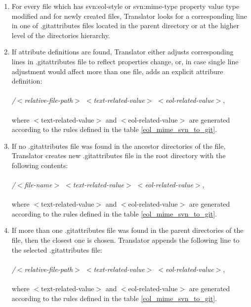 \begin{enumerate}
\compactlist
\item For every file which has svn:eol-style or svn:mime-type property value type modified \footnotemark[1] and for newly created files, Translator looks for a corresponding line in one of .gitattributes files located in the parent directory or at the higher level of the directories hierarchy.\\
	
\item If attribute definitions are found, Translator either adjusts corresponding lines in .gitattributes file to reflect properties change, 
or, in case single line adjustment would affect more than one file, adds an explicit attribure definition:\\\\
\emph{/$<$relative-file-path$>$ $<$text-related-value$>$ $<$eol-related-value$>$},\\\\
where $<$text-related-value$>$ and $<$eol-related-value$>$ are generated according to the rules defined in the table \ref{eol_mime_svn_to_git}.\\
	
\item If no .gitattributes file was found in the ancestor directories of the file, Translator creates new .gitattributes file in the root directory with the following contents:\\\\
\emph{/$<$file-name$>$ $<$text-related-value$>$ $<$eol-related-value$>$},\\\\
where $<$text-related-value$>$ and $<$eol-related-value$>$ are generated according to the rules defined in the table \ref{eol_mime_svn_to_git}.\\
	
\item If more than one .gitattributes file was found in the parent directories of the file, then the closest one is chosen. 
Translator appends the following line to the selected .gitattributes file:\\\\
\emph{/$<$relative-file-path$>$ $<$text-related-value$>$ $<$eol-related-value$>$},\\\\
where $<$text-related-value$>$ and $<$eol-related-value$>$ are generated according to the rules defined in the table \ref{eol_mime_svn_to_git}.\\
\end{enumerate}

